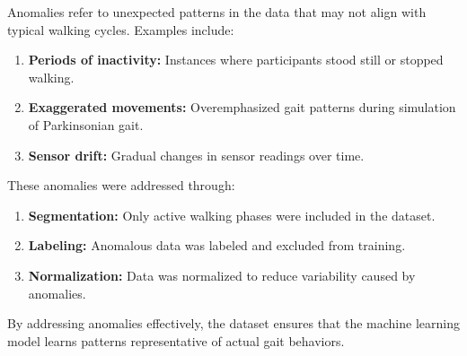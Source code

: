 Anomalies refer to unexpected patterns in the data that may not align with typical walking cycles. Examples include:
\begin{enumerate}
\item \textbf{Periods of inactivity:} Instances where participants stood still or stopped walking.

\item\textbf{ Exaggerated movements:} Overemphasized gait patterns during simulation of Parkinsonian gait.

\item \textbf{Sensor drift:} Gradual changes in sensor readings over time.
\end{enumerate}
These anomalies were addressed through:
\begin{enumerate}
\item \textbf{Segmentation:} Only active walking phases were included in the dataset.

\item \textbf{Labeling:} Anomalous data was labeled and excluded from training.

\item \textbf{Normalization:} Data was normalized to reduce variability caused by anomalies\cite{ZhangWenwen:2022}.
\end{enumerate}
By addressing anomalies effectively, the dataset ensures that the machine learning model learns patterns representative of actual gait behaviors.
